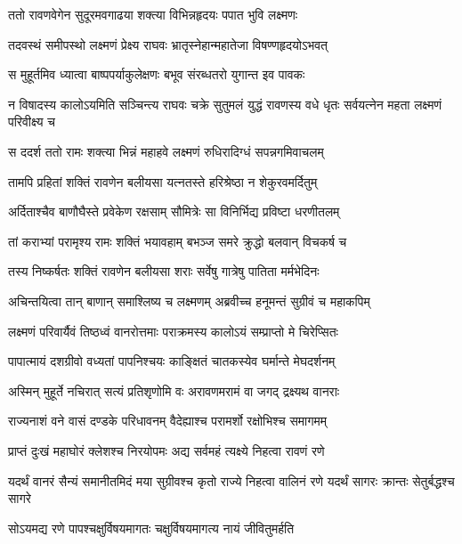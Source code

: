 \twolineshloka
{ततो रावणवेगेन सुदूरमवगाढया}
{शक्त्या विभिन्नहृदयः पपात भुवि लक्ष्मणः} %

\twolineshloka
{तदवस्थं समीपस्थो लक्ष्मणं प्रेक्ष्य राघवः}
{भ्रातृस्नेहान्महातेजा विषण्णहृदयोऽभवत्} %

\twolineshloka
{स मुहूर्तमिव ध्यात्वा बाष्पपर्याकुलेक्षणः}
{बभूव संरब्धतरो युगान्त इव पावकः} %

\threelineshloka
{न विषादस्य कालोऽयमिति सञ्चिन्त्य राघवः}
{चक्रे सुतुमलं युद्धं रावणस्य वधे धृतः}
{सर्वयत्नेन महता लक्ष्मणं परिवीक्ष्य च} %

\twolineshloka
{स ददर्श ततो रामः शक्त्या भिन्नं महाहवे}
{लक्ष्मणं रुधिरादिग्धं सपन्नगमिवाचलम्} %

\twolineshloka
{तामपि प्रहितां शक्तिं रावणेन बलीयसा}
{यत्नतस्ते हरिश्रेष्ठा न शेकुरवमर्दितुम्} %

\twolineshloka
{अर्दिताश्चैव बाणौघैस्ते प्रवेकेण रक्षसाम्}
{सौमित्रेः सा विनिर्भिद्य प्रविष्टा धरणीतलम्} %

\twolineshloka
{तां कराभ्यां परामृश्य रामः शक्तिं भयावहाम्}
{बभञ्ज समरे क्रुद्धो बलवान् विचकर्ष च} %

\twolineshloka
{तस्य निष्कर्षतः शक्तिं रावणेन बलीयसा}
{शराः सर्वेषु गात्रेषु पातिता मर्मभेदिनः} %

\twolineshloka
{अचिन्तयित्वा तान् बाणान् समाश्लिष्य च लक्ष्मणम्}
{अब्रवीच्च हनूमन्तं सुग्रीवं च महाकपिम्} %

\twolineshloka
{लक्ष्मणं परिवार्यैवं तिष्ठध्वं वानरोत्तमाः}
{पराक्रमस्य कालोऽयं सम्प्राप्तो मे चिरेप्सितः} %

\twolineshloka
{पापात्मायं दशग्रीवो वध्यतां पापनिश्चयः}
{काङ्क्षितं चातकस्येव घर्मान्ते मेघदर्शनम्} %

\twolineshloka
{अस्मिन् मुहूर्ते नचिरात् सत्यं प्रतिशृणोमि वः}
{अरावणमरामं वा जगद् द्रक्ष्यथ वानराः} %

\twolineshloka
{राज्यनाशं वने वासं दण्डके परिधावनम्}
{वैदेह्याश्च परामर्शो रक्षोभिश्च समागमम्} %

\twolineshloka
{प्राप्तं दुःखं महाघोरं क्लेशश्च निरयोपमः}
{अद्य सर्वमहं त्यक्ष्ये निहत्वा रावणं रणे} %

\threelineshloka
{यदर्थं वानरं सैन्यं समानीतमिदं मया}
{सुग्रीवश्च कृतो राज्ये निहत्वा वालिनं रणे}
{यदर्थं सागरः क्रान्तः सेतुर्बद्धश्च सागरे} %

\twolineshloka
{सोऽयमद्य रणे पापश्चक्षुर्विषयमागतः}
{चक्षुर्विषयमागत्य नायं जीवितुमर्हति} %

